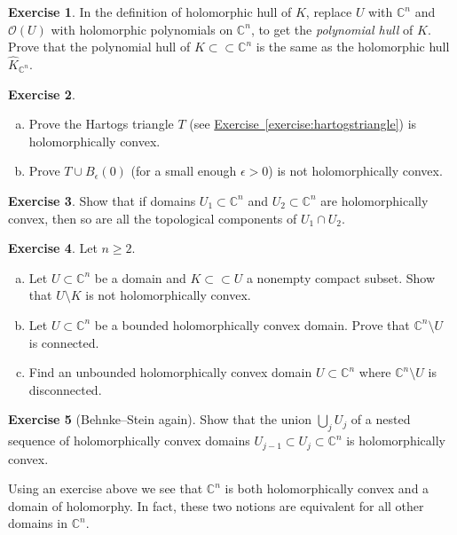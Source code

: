 \documentclass[12pt,openany]{book}
\newcommand{\C}{{\mathbb{C}}}
\newcommand{\sO}{{\mathscr{O}}}
\newcommand{\myindex}[1]{#1\index{#1}}
\theoremstyle{plain}
\theoremstyle{remark}
\theoremstyle{definition}
\newenvironment{exbox}{%
    \def\FrameCommand{\vrule width 1pt \relax\hspace{10pt}}%
    \MakeFramed {\advance \hsize -\width \FrameRestore}%
}{%
    \endMakeFramed
}
\newenvironment{exparts}{%
    \leavevmode\begin{enumerate}[a),noitemsep,topsep=0pt,parsep=0pt,partopsep=0pt]
}{%
    \end{enumerate}
}
\theoremstyle{exercise}
\newtheorem{exercise}{Exercise}[section]
\theoremstyle{example}
\newcommand{\exerciseref}[1]{\hyperref[#1]{Exercise~\ref*{#1}}}
\begin{document}
\begin{exbox}
\begin{exercise}
In the definition of holomorphic hull of $K$, replace $U$ with $\C^n$
and $\sO(U)$ with holomorphic polynomials on $\C^n$, to get the
\emph{\myindex{polynomial hull}} of $K$.  Prove that the polynomial hull of
$K \subset \subset \C^n$ is the same as the holomorphic hull $\widehat{K}_{\C^n}$.
\end{exercise}

\begin{exercise}
\begin{exparts}
\item Prove the Hartogs triangle $T$ (see \exerciseref{exercise:hartogstriangle})
is holomorphically convex.
\item Prove $T \cup B_{\epsilon}(0)$ (for a small enough $\epsilon > 0$) is
not holomorphically convex.
\end{exparts}
\end{exercise}

\begin{exercise}
Show that if domains $U_1 \subset \C^n$ and $U_2 \subset \C^n$ are
holomorphically convex,
then so are all the topological components of $U_1 \cap U_2$.
\end{exercise}

\begin{exercise}
\pagebreak[2]
Let $n \geq 2$.
\begin{exparts}
\item
Let $U \subset \C^n$ be a domain and $K \subset \subset U$
a nonempty compact subset.  Show that $U \setminus K$ is not
holomorphically convex.
\item
Let $U \subset \C^n$ be a bounded holomorphically
convex domain.  Prove that $\C^n \setminus U$ is connected.
\item
Find an unbounded holomorphically convex domain $U \subset \C^n$ where
$\C^n \setminus U$ is disconnected.
\end{exparts}
\end{exercise}

\begin{exercise}[Behnke--Stein again]
Show that the union $\bigcup_j U_j$ of a nested sequence of holomorphically
convex domains $U_{j-1} \subset U_j \subset \C^n$ is holomorphically convex.
\end{exercise}
\end{exbox}

Using an exercise above we see that $\C^n$ is both holomorphically convex and
a domain of holomorphy.  In fact, these two notions are equivalent for all
other domains in $\C^n$.
\end{document}
